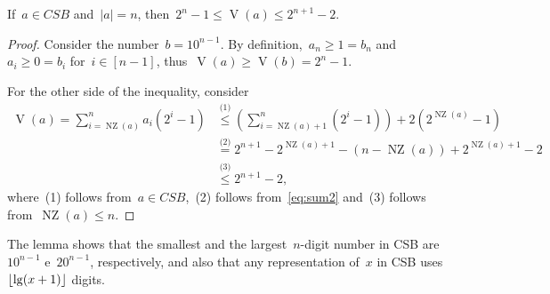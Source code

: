 \documentclass[main.tex]{subfiles}
\newcommand{\NZ}{\operatorname{NZ}}
\newcommand{\CSB}{\textit{CSB}}
\renewcommand{\V}{\operatorname{V}}
\begin{document}
\begin{lemma} \label{lem:csbdig}
    If~$a \in \CSB$ and~$|a| = n$, then~$2^n - 1 \leq \V(a) \leq 2^{n+1}-2$.
\end{lemma}
\begin{proof}
    Consider the number~$b = 10^{n-1}$. By definition,~$a_n \geq 1 = b_n$ and~$a_i \geq 0 = b_i$ for~$i \in [n - 1]$, thus~$\V(a) \geq \V(b) = 2^n - 1$.

    For the other side of the inequality, consider
	\begin{align*}
	\V(a) = \sum\limits_{i = \NZ(a)}^n{a_i (2^i - 1)} &\stackrel{\text{(1)}}{\leq} \left(\sum\limits_{i = \NZ(a) + 1}^n (2^i - 1)\right) + 2 (2^{\NZ(a)} - 1) \\
	&\stackrel{\text{(2)}}{=} 2^{n+1} - 2^{\NZ(a)+1} - (n - \NZ(a)) + 2^{\NZ(a) + 1} - 2 \\
	&\stackrel{\text{(3)}}{\leq} 2^{n+1} - 2,
	\end{align*}
	where~(1) follows from~$a \in \CSB$,~(2) follows from~\eqref{eq:sum2} and~(3) follows from~$\NZ(a) \leq n$.
\end{proof}

The lemma shows that the smallest and the largest~$n$-digit number in CSB are~$10^{n-1}$ e~$20^{n-1}$, respectively, and also that any representation of~$x$ in CSB uses~$\lfloor\lg(x + 1)\rfloor$ digits.
\end{document}
